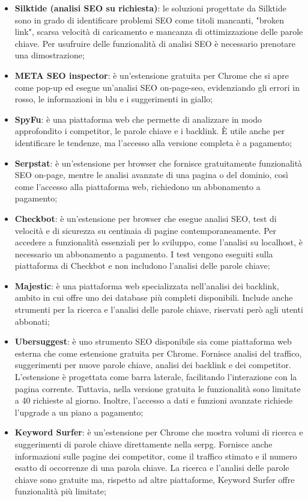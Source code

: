\begin{itemize}
    \item \textbf{Silktide (analisi SEO su richiesta)}: le soluzioni progettate da Silktide sono in grado di identificare problemi SEO come titoli mancanti, "broken link", scarsa velocità di caricamento e mancanza di ottimizzazione delle parole chiave. Per usufruire delle funzionalità di analisi SEO è necessario prenotare una dimostrazione;
    \item \textbf{META SEO inspector}: è un'estensione gratuita per Chrome che si apre come pop-up ed esegue un'analisi SEO \gls{on-page-seo}, evidenziando gli errori in rosso, le informazioni in blu e i suggerimenti in giallo;
    \item \textbf{SpyFu}: è una piattaforma web che permette di analizzare in modo approfondito i competitor, le parole chiave e i \gls{backlink}. È utile anche per identificare le tendenze, ma l'accesso alla versione completa è a pagamento;
    \item \textbf{Serpstat}: è un’estensione per browser che fornisce gratuitamente funzionalità SEO on-page, mentre le analisi avanzate di una pagina o del dominio, così come l’accesso alla piattaforma web, richiedono un abbonamento a pagamento;
    \item \textbf{Checkbot}: è un'estensione per browser che esegue analisi SEO, test di velocità e di sicurezza su centinaia di pagine contemporaneamente. Per accedere a funzionalità essenziali per lo sviluppo, come l'analisi su \gls{localhost}, è necessario un abbonamento a pagamento. I test vengono eseguiti sulla piattaforma di Checkbot e non includono l'analisi delle parole chiave;
    \item \textbf{Majestic}: è una piattaforma web specializzata nell’analisi dei backlink, ambito in cui offre uno dei database più completi disponibili. Include anche strumenti per la ricerca e l’analisi delle parole chiave, riservati però agli utenti abbonati;
    \item \textbf{Ubersuggest}: è uno strumento SEO disponibile sia come piattaforma web esterna che come estensione gratuita per Chrome. Fornisce analisi del traffico, suggerimenti per nuove parole chiave, analisi dei backlink e dei competitor. L'estensione è progettata come barra laterale, facilitando l'interazione con la pagina corrente. Tuttavia, nella versione gratuita le funzionalità sono limitate a 40 richieste al giorno. Inoltre, l'accesso a dati e funzioni avanzate richiede l'upgrade a un piano a pagamento;
    \item \textbf{Keyword Surfer}: è un'estensione per Chrome che mostra volumi di ricerca e suggerimenti di parole chiave direttamente nella \gls{serpg}. Fornisce anche informazioni sulle pagine dei competitor, come il traffico stimato e il numero esatto di occorrenze di una parola chiave. La ricerca e l'analisi delle parole chiave sono gratuite ma, rispetto ad altre piattaforme, Keyword Surfer offre funzionalità più limitate;

\end{itemize}
